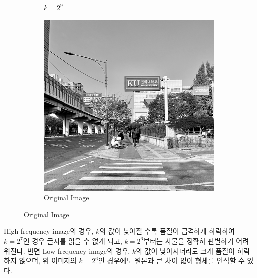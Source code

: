 \begin{figure}[H]
\begin{subfigure}[b]{0.3\textwidth}
        \caption{$k = 2^9$}
    \end{subfigure}
    \hfill
    \begin{subfigure}[b]{0.3\textwidth}
        \centering
        \includegraphics[width=\textwidth]{problem2/high_freq.bmp}
        \caption{Original Image}
    \end{subfigure}
\end{figure}
High frequency image의 경우, $k$의 값이 낮아질 수록 품질이 급격하게 하락하여 $k = 2^7$인 경우 글자를 읽을 수 없게 되고,
$k = 2^6$부터는 사물을 정확히 판별하기 어려워진다.
반면 Low frequency image의 경우, $k$의 값이 낮아지더라도 크게 품질이 하락하지 않으며, 위 이미지의 $k=2^6$인 경우에도 원본과 큰 차이 없이 형체를 인식할 수 있다.

